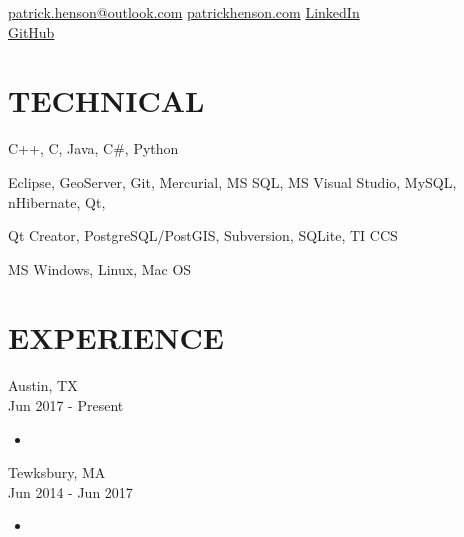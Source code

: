 \documentclass{article}
\begin{document}
\renewcommand\familydefault{\sfdefault}



\hfill

\noindent\hrulefill

\noindent 
\href{mailto:fullname@email.com}{patrick.henson@outlook.com}
\hfill
\href{https://patrickhenson.com}{patrickhenson.com}
\hfill
\href{linkedin.com/in/patrickhenson}{LinkedIn}
\\
\noindent
\hfill
\href{https://github.com/PatrickHenson}{GitHub}

\section*{TECHNICAL}

 \hspace{5.0em}
C++, C, Java, C\#, Python

 \hspace{1.0em}
Eclipse, GeoServer, Git, Mercurial, MS SQL, MS Visual Studio, MySQL, nHibernate, Qt,

\hspace{9.0em} Qt Creator, PostgreSQL/PostGIS, Subversion, SQLite, TI CCS

 \hspace{0.5em}
MS Windows, Linux, Mac OS

\section*{EXPERIENCE}

 \hfill Austin, TX \\
 \hfill Jun 2017 - Present
\begin{itemize}
\item 
\end{itemize}

 \hfill Tewksbury, MA \\
 \hfill Jun 2014 - Jun 2017
\begin{itemize}
\item 
\end{itemize}
\end{document}
